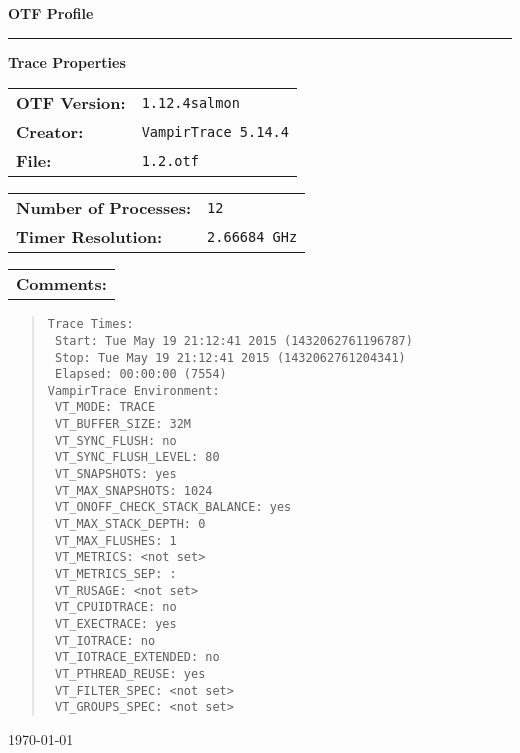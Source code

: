 \documentclass[a4paper,10pt]{article}
\begin{document}
\begin{titlepage}\thispagestyle{empty}
\begin{huge}\begin{flushleft}\bf{OTF Profile}\end{flushleft}\end{huge}
\hrule
\begin{flushright}\textbf{\large Trace Properties}\end{flushright}
\vspace{0.5\baselineskip}
\begin{flushleft}
\begin{tabular}{ll}
\bf{OTF Version:} & \verb|1.12.4salmon| \\
\bf{Creator:} & \verb|VampirTrace 5.14.4|\\
\bf{File:} & \verb|1.2.otf|
\end{tabular}

\vspace{1\baselineskip}
\begin{tabular}{ll}
\bf{Number of Processes:} & \verb|12|\\
\bf{Timer Resolution:} & \verb|2.66684 GHz|
\end{tabular}

\vspace{1\baselineskip}
\begin{tabular}{l}\bf{Comments:}\end{tabular}
\begin{quote}\begin{verbatim}
Trace Times:
 Start: Tue May 19 21:12:41 2015 (1432062761196787)
 Stop: Tue May 19 21:12:41 2015 (1432062761204341)
 Elapsed: 00:00:00 (7554)
VampirTrace Environment:
 VT_MODE: TRACE
 VT_BUFFER_SIZE: 32M
 VT_SYNC_FLUSH: no
 VT_SYNC_FLUSH_LEVEL: 80
 VT_SNAPSHOTS: yes
 VT_MAX_SNAPSHOTS: 1024
 VT_ONOFF_CHECK_STACK_BALANCE: yes
 VT_MAX_STACK_DEPTH: 0
 VT_MAX_FLUSHES: 1
 VT_METRICS: <not set>
 VT_METRICS_SEP: :
 VT_RUSAGE: <not set>
 VT_CPUIDTRACE: no
 VT_EXECTRACE: yes
 VT_IOTRACE: no
 VT_IOTRACE_EXTENDED: no
 VT_PTHREAD_REUSE: yes
 VT_FILTER_SPEC: <not set>
 VT_GROUPS_SPEC: <not set>
\end{verbatim}\end{quote}
\end{flushleft}
\vspace*{\fill}
\begin{flushright}\today\end{flushright}
\end{titlepage}
\end{document}
